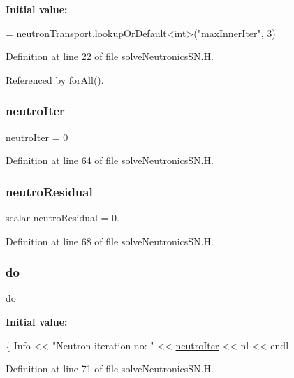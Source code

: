 {\bfseries Initial value\+:}
\begin{DoxyCode}
=
    \hyperlink{solveNeutronics_8H_ac82f3800c6fe7f00c65fbf04d3c1050d}{neutronTransport}.lookupOrDefault<\textcolor{keywordtype}{int}>(\textcolor{stringliteral}{"maxInnerIter"}, 3)
\end{DoxyCode}


Definition at line 22 of file solve\+Neutronics\+S\+N.\+H.



Referenced by for\+All().

\mbox{\label{solveNeutronicsSN_8H_a5ea48e0170faff29dfdd3cbba330d51d}} 
\subsubsection{\texorpdfstring{neutro\+Iter}{neutroIter}}
{\footnotesize\ttfamily neutro\+Iter = 0}



Definition at line 64 of file solve\+Neutronics\+S\+N.\+H.

\mbox{\label{solveNeutronicsSN_8H_a2a3baa00ecfd5a47c6f6ba475a66d2c6}} 
\subsubsection{\texorpdfstring{neutro\+Residual}{neutroResidual}}
{\footnotesize\ttfamily scalar neutro\+Residual = 0.}



Definition at line 68 of file solve\+Neutronics\+S\+N.\+H.

\mbox{\label{solveNeutronicsSN_8H_a721c6ff80a6d3e4ad4ffa52a04c60085}} 
\subsubsection{\texorpdfstring{do}{do}}
{\footnotesize\ttfamily do}

{\bfseries Initial value\+:}
\begin{DoxyCode}
\{
    Info << \textcolor{stringliteral}{"Neutron iteration no:  "} << \hyperlink{solveNeutronicsSN_8H_a5ea48e0170faff29dfdd3cbba330d51d}{neutroIter} << nl << endl
\end{DoxyCode}


Definition at line 71 of file solve\+Neutronics\+S\+N.\+H.

